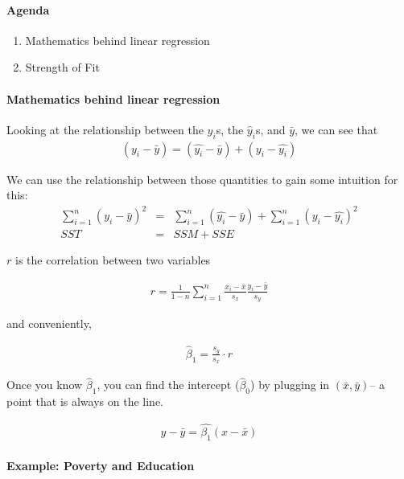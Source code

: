 \documentclass[10pt]{article}\usepackage[]{graphicx}\usepackage[]{color}
\begin{document}
\paragraph{Agenda}
\begin{enumerate}
  \itemsep0em
  \item Mathematics behind linear regression
  \item Strength of Fit
\end{enumerate}

\paragraph{Mathematics behind linear regression}


Looking at the relationship between the $y_i$s, the $\hat{y}_i$s, and $\bar{y}$, we can see that
\begin{eqnarray*}
(y_i -\bar{y}) = (\hat{y_i}-\bar{y}) + (y_i -\hat{y_i})
\end{eqnarray*}
\vspace{1.5in}

We can use the relationship between those quantities to gain some intuition for this:
\begin{eqnarray*}
\sum_{i=1}^n (y_i -\bar{y})^2 &=& \sum_{i=1}^n (\hat{y_i}-\bar{y}) + \sum_{i=1}^n (y_i-\hat{y_i})^2 \\
SST &=& SSM + SSE
\end{eqnarray*}

$r$ is the correlation between two variables

\begin{eqnarray*}
r = \frac{1}{1-n}\sum_{i=1}^n \frac{x_i-\bar{x}}{s_x}\frac{y_i-\bar{y}}{s_y}
\end{eqnarray*}

and conveniently,

\begin{eqnarray*}
\hat{\beta}_1 = \frac{s_y}{s_x}\cdot r
\end{eqnarray*}

Once you know $\hat{\beta}_1$, you can find the intercept ($\hat{\beta}_0$) by plugging in $(\bar{x}, \bar{y})$-- a point that is always on the line. 

\begin{eqnarray*}
y-\bar{y}=\hat{\beta_1}(x -\bar{x})
\end{eqnarray*}

\paragraph{Example: Poverty and Education}
\end{document}
